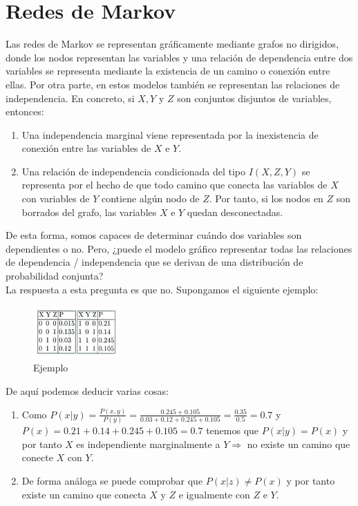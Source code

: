 \documentclass{article}
\theoremstyle{definition_wo_parentheses}
\begin{document}
\section{Redes de Markov}
Las redes de Markov se representan gráficamente mediante grafos no dirigidos, donde los nodos representan las variables y una relación de dependencia entre dos variables se representa mediante la existencia de un camino o conexión entre ellas. Por otra parte, en estos modelos también se representan las relaciones de independencia. En concreto, si $X,Y$ y $Z$ son conjuntos disjuntos de variables, entonces:
\begin{enumerate}
\item Una independencia marginal viene representada por la inexistencia de conexión entre las variables de $X$ e $Y$.
\item Una relación de independencia condicionada del tipo $I(X,Z,Y)$ se representa por el hecho de que todo camino que conecta las variables de $X$ con variables de $Y$ contiene algún nodo de $Z$. Por tanto, si los nodos en $Z$ son borrados del grafo, las variables $X$ e $Y$ quedan desconectadas.
\end{enumerate}

De esta forma, somos capaces de determinar cuándo dos variables son dependientes o no. Pero, ¿puede el modelo gráfico representar todas las relaciones de dependencia / independencia que se derivan de una distribución de probabilidad conjunta?\\
La respuesta a esta pregunta es que no. Supongamos el siguiente ejemplo:

\begin{figure}[H]
\centering
\includegraphics[width=0.3\textwidth]{ejemplo}
\caption{Ejemplo} \label{fig:ejemplo}
\end{figure}

De aquí podemos deducir varias cosas:
\begin{enumerate}
\item Como $P(x|y)=\frac{P(x,y)}{P(y)} = \frac{0.245+0.105}{0.03+0.12+0.245+0.105} = \frac{0.35}{0.5} = 0.7$ y $P(x)=0.21+0.14+0.245+0.105 = 0.7$ tenemos que $P(x|y)=P(x)$ y por tanto $X$ es independiente marginalmente a $Y \Rightarrow$ no existe un camino que conecte $X$ con $Y$.
\item De forma análoga se puede comprobar que $P(x|z)\neq P(x)$ y por tanto existe un camino que conecta $X$ y $Z$ e igualmente con $Z$ e $Y$.
\end{enumerate}
\end{document}

